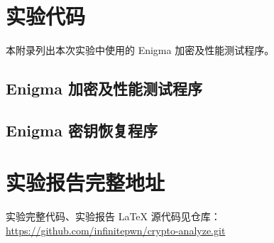 \clearpage
\appendix
\section{实验代码}

本附录列出本次实验中使用的 Enigma 加密及性能测试程序。

\subsection{Enigma 加密及性能测试程序}


\subsection{Enigma 密钥恢复程序}

\section{实验报告完整地址}
实验完整代码、实验报告 \LaTeX{} 源代码见仓库：
\url{https://github.com/infinitepwn/crypto-analyze.git}

